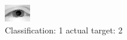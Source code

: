 \begin{figure}[h!]
\begin{center}
\includegraphics[width=0.60\columnwidth]{figures/ID2374_class_1_target_2.png}
\end{center}
\caption{ Classification: 1 actual target: 2}
\label{fig:ID2374_class_1_target_2}
\end{figure}
